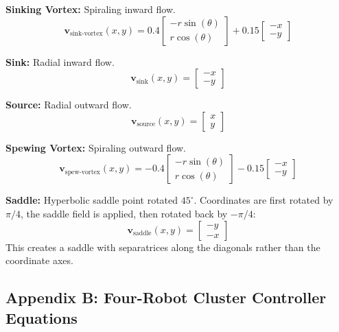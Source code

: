 \documentclass[lettersize,journal]{IEEEtran}
\begin{document}
\textbf{Sinking Vortex:} Spiraling inward flow.
\begin{equation}
\mathbf{v}_{\text{sink-vortex}}(x, y) = 0.4 \begin{bmatrix} -r \sin(\theta) \\ r \cos(\theta) \end{bmatrix} + 0.15 \begin{bmatrix} -x \\ -y \end{bmatrix}
\end{equation}

\textbf{Sink:} Radial inward flow.
\begin{equation}
\mathbf{v}_{\text{sink}}(x, y) = \begin{bmatrix} -x \\ -y \end{bmatrix}
\end{equation}

\textbf{Source:} Radial outward flow.
\begin{equation}
\mathbf{v}_{\text{source}}(x, y) = \begin{bmatrix} x \\ y \end{bmatrix}
\end{equation}

\textbf{Spewing Vortex:} Spiraling outward flow.
\begin{equation}
\mathbf{v}_{\text{spew-vortex}}(x, y) = -0.4 \begin{bmatrix} -r \sin(\theta) \\ r \cos(\theta) \end{bmatrix} - 0.15 \begin{bmatrix} -x \\ -y \end{bmatrix}
\end{equation}

\textbf{Saddle:} Hyperbolic saddle point rotated $45^\circ$. Coordinates are first rotated by $\pi/4$, the saddle field is applied, then rotated back by $-\pi/4$:
\begin{equation}
\mathbf{v}_{\text{saddle}}(x, y) = \begin{bmatrix} -y \\ -x \end{bmatrix}
\end{equation}
This creates a saddle with separatrices along the diagonals rather than the coordinate axes.

\subsection{Appendix B: Four-Robot Cluster Controller Equations}
\end{document}
